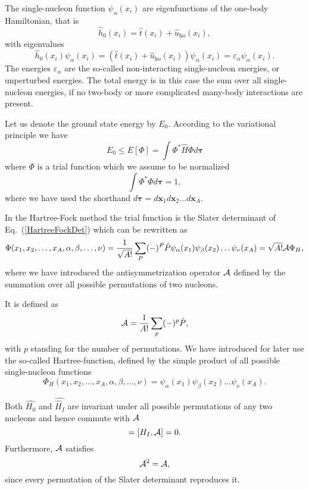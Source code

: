 The single-nucleon function $\psi_{\alpha}(x_i)$ are eigenfunctions of
the one-body Hamiltonian, that is
\[
\hat{h}_0(x_i)=\hat{t}(x_i) + \hat{u}_{\mathrm{ho}}(x_i),
\]
with eigenvalues
\[
\hat{h}_0(x_i) \psi_{\alpha}(x_i)=\left(\hat{t}(x_i) +
\hat{u}_{\mathrm{ho}}(x_i)\right)\psi_{\alpha}(x_i)=\varepsilon_{\alpha}\psi_{\alpha}(x_i).
\]
The energies $\varepsilon_{\alpha}$ are the so-called non-interacting
single-nucleon energies, or unperturbed energies.  The total energy is
in this case the sum over all single-nucleon energies, if no two-body
or more complicated many-body interactions are present.

Let us denote the ground state energy by $E_0$. According to the
variational principle we have
\begin{equation*}
  E_0 \le E[\Phi] = \int \Phi^*\hat{H}\Phi d\mathbf{\tau}
\end{equation*}
where $\Phi$ is a trial function which we assume to be normalized
\begin{equation*}
  \int \Phi^*\Phi d\mathbf{\tau} = 1,
\end{equation*}
where we have used the shorthand
$d\mathbf{\tau}=d\mathbf{x}_1d\mathbf{x}_2\dots d\mathbf{x}_A$.

In the Hartree-Fock method the trial function is the Slater
determinant of Eq.~(\ref{HartreeFockDet}) which can be rewritten as
\begin{equation}
  \Phi(x_1,x_2,\dots,x_A,\alpha,\beta,\dots,\nu) =
  \frac{1}{\sqrt{A!}}\sum_{P} (-)^P\hat{P}\psi_{\alpha}(x_1)
  \psi_{\beta}(x_2)\dots\psi_{\nu}(x_A)=\sqrt{A!}{\cal A}\Phi_H,
\label{HartreeFockPermutation}
\end{equation}
where we have introduced the antisymmetrization operator ${\cal A}$
defined by the summation over all possible permutations of two
nucleons.

It is defined as
\begin{equation}
  {\cal A} = \frac{1}{A!}\sum_{p} (-)^p\hat{P},
\label{antiSymmetryOperator}
\end{equation}
with $p$ standing for the number of permutations. We have introduced
for later use the so-called Hartree-function, defined by the simple
product of all possible single-nucleon functions
\begin{equation*}
  \Phi_H(x_1,x_2,\dots,x_A,\alpha,\beta,\dots,\nu) =
  \psi_{\alpha}(x_1) \psi_{\beta}(x_2)\dots\psi_{\nu}(x_A).
\end{equation*}

Both $\hat{H_0}$ and $\hat{\hat{H}_I}$ are invariant under all
possible permutations of any two nucleons and hence commute with
${\cal A}$
\begin{equation}
  [H_0,{\cal A}] = [H_I,{\cal A}] = 0.
  \label{cummutionAntiSym}
\end{equation}
Furthermore, ${\cal A}$ satisfies
\begin{equation}
  {\cal A}^2 = {\cal A},
  \label{AntiSymSquared}
\end{equation}
since every permutation of the Slater determinant reproduces it.

